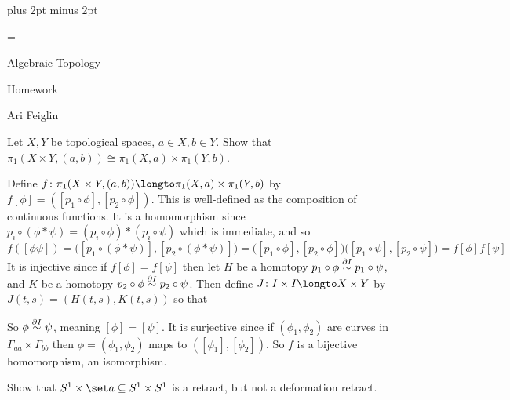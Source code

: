 

\parindent=0pt
\parskip=3pt plus 2pt minus 2pt



\footline={}

\setcounter{section}{4}


\def\printmcount{\the\counter{section}.\the\counter{math counter}}

{

    \centerline{Algebraic Topology}
    \smallskip
    \centerline{Homework \the{}}
    \centerline{Ari Feiglin}

\eppbox}

\bexerc

    Let $X,Y$ be topological spaces, $a\in X,b\in Y$.
    Show that $\pi_1(X\times Y,(a,b))\cong\pi_1(X,a)\times\pi_1(Y,b)$.

\eexerc

Define $f\colon\pi_1(X\times Y,(a,b))\longto\pi_1(X,a)\times\pi_1(Y,b)$ by $f[\phi]=([p_1\circ\phi],[p_2\circ\phi])$.
This is well-defined as the composition of continuous functions.
It is a homomorphism since $p_i\circ(\phi*\psi)=(p_i\circ\phi)*(p_i\circ\psi)$ which is immediate, and so
$$ f([\phi\psi]) = \bigl([p_1\circ(\phi*\psi)],[p_2\circ(\phi*\psi)]\bigr) = \bigl([p_1\circ\phi],[p_2\circ\phi]\bigr)\bigl([p_1\circ\psi],[p_2\circ\psi]\bigr) = f[\phi]f[\psi] $$
It is injective since if $f[\phi]=f[\psi]$ then let $H$ be a homotopy $p_1\circ\phi\hdi p_1\circ\psi$, and $K$ be a homotopy $p_2\circ\phi\hdi p_2\circ\psi$.
Then define $J\colon I\times I\longto X\times Y$ by $J(t,s)=(H(t,s),K(t,s))$ so that

So $\phi\hdi\psi$, meaning $[\phi]=[\psi]$.
It is surjective since if $(\phi_1,\phi_2)$ are curves in $\Gamma_{aa}\times\Gamma_{bb}$ then $\phi=(\phi_1,\phi_2)$ maps to $([\phi_1],[\phi_2])$.
So $f$ is a bijective homomorphism, an isomorphism.

\bexerc

    Show that $S^1\times\set a\subseteq S^1\times S^1$ is a retract, but not a deformation retract.

